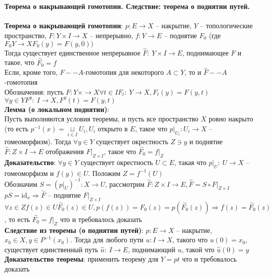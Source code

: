 \newpage
\section{}
	\textbf{Теорема о накрывающей гомотопии. Следствие: теорема о поднятии путей.}\\
	\\
	\textbf{Теорема о накрывающей гомотопии}: $p: E \rightarrow X$ -- накрытие, $Y$ -- топологические пространство, $F: Y\times I \rightarrow X$ -- непрерывно, $f: Y \rightarrow E$ -- поднятие $F_0$ (где $F_0 Y\rightarrow X F_0 (y) = F(y,0))$\\
	Тогда существует единственное непрерывное $\overset{\sim}{F}:\ Y\times I \rightarrow E$, поднимающее $F$ и такое, что $\overset{\sim}{F_0} = f$\\
	Если, кроме того, $F -- A$-гомотопия для некоторого $A\subset Y$, то и $\overset{\sim}{F} -- A$-гомотопия\\
	Обозначения: пусть $F: Y\times \rightarrow X \forall t\in I F_t:\ Y\rightarrow X, F_t (y) = F(y,t)$\\
	$\forall y \in Y F^y:\ I\rightarrow X, F^y (t) = F(y,t)$\\
	\textbf{Лемма (о локальном поднятии)}:\\
	Пусть выполняются условия теоремы, и пусть все пространство $X$ ровно накрыто (то есть $p^{-1} (x) = \underset{i\in I}{\sqcup} U_i, U_i$ открыто в $E$, такое что ${p|}_{U_i}: U_i \rightarrow X$ -- гомеоморфизм). Тогда $\forall y\in Y$ существует окрестность $Z \ni y$ и поднятие $\overset{\sim}{F}: Z\times I \rightarrow E$ отображения ${F|}_{Z\times I}$, такое что $\overset{\sim}{F_0} = {f|}_Z$\\
	\textbf{Доказательство}: $\forall y\in Y$ существует окрестность $U\subset E$, такая что ${p|}_U:\ U\rightarrow X$ -- гомеоморфизм и $f(y)\in U$. Положим $Z = f^{-1} (U)$\\
	Обозначим $S = ({p|}_U)^{-1}: X\rightarrow U$, рассмотрим $\overset{\sim}{F}: Z\times I \rightarrow E, \overset{\sim}{F} = S \circ {F|}_{Z\times I}$\\
	$pS =  \text{id}_x \Rightarrow \overset{\sim}{F}$ -- поднятие ${F|}_{Z\times I}$\\
	$\forall z\in Z f(z) \in U \overset{\sim}{F_0} (z) \in U, p(f(z)) = F_0 (z) = p(\overset{\sim}{F_0} (z)) \Rightarrow f(z) = \overset{\sim}{F_0} (z)$, то есть $\overset{\sim}{F_0} = {f|}_Z$ что и требовалось доказать\\
	\textbf{Следствие из теоремы (о поднятии путей)}: $p: E\rightarrow X$ -- накрытие, $x_0 \in X, y\in P^{-1} (x_0)$. Тогда для любого пути $u: I\rightarrow X$, такого что $u(0) = x_0$, существует единственный путь $\overset{\sim}{u}:\ I \rightarrow E$, поднимающий $u$, такой что $\overset{\sim}{u} (0) = y$\\
	\textbf{Доказательство теоремы}: применить теорему для $Y = pt$ что и требовалось доказать
	


